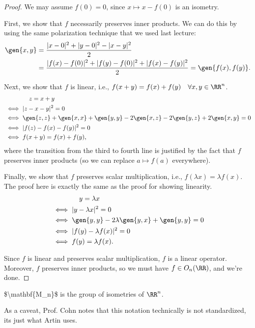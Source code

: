 \begin{proof}
We may assume $f(0)=0$, since $x\mapsto x-f(0)$ is an isometry.

First, we show that $f$ necessarily preserves inner products. We can do this by using the same polarization technique that we used last lecture: 
\begin{align*}
    \gen{x,y} &= \frac{\vert x-0\vert ^2 + \vert y-0\vert ^2 - \vert x-y\vert^2}{2} \\
    &= \frac{\vert f(x)-f(0)\vert ^2 + \vert f(y)-f(0)\vert ^2 + \vert f(x) - f(y)\vert ^2}{2} = \gen{f(x), f(y)}.
\end{align*}

Next, we show that $f$ is linear, i.e., $f(x+y) = f(x)+f(y)\quad \forall x,y\in \RR^n$. 
\begin{align*}
    &\qquad\qquad  z = x+y\\
    &\iff \vert z-x-y\vert^2 = 0 \\
    &\iff \gen{z,z} + \gen{x,x} + \gen{y,y} - 2\gen{x,z} - 2\gen{y,z} + 2\gen{x,y} = 0 \\
    &\iff \vert f(z) - f(x) - f(y)\vert ^2 = 0\\
    &\iff f(x+y) = f(x) + f(y),
\end{align*}
where the transition from the third to fourth line is justified by the fact that $f$ preserves inner products (so we can replace $a\mapsto f(a)$ everywhere). 

Finally, we show that $f$ preserves scalar multiplication, i.e., $f(\lambda x) = \lambda f(x)$. The proof here is exactly the same as the proof for showing linearity. 
\begin{align*}
    &\qquad\qquad  y = \lambda x\\
    &\iff \vert y-\lambda x\vert^2 = 0 \\
    &\iff \gen{y,y} - 2\lambda\gen{y, x} + \gen{y,y} = 0 \\
    &\iff \vert f(y) - \lambda f(x)\vert ^2 = 0\\
    &\iff f(y) = \lambda f(x).
\end{align*}

Since $f$ is linear and preserves scalar multiplication, $f$ is a linear operator. Moreover, $f$ preserves inner products, so we must have $f\in O_n(\RR)$, and we're done. 
\end{proof}

\begin{definition}

\ac{$\mathbf{M_n}$} is the group of isometries of $\RR^n$.
\end{definition}

As a caveat, Prof. Cohn notes that this notation technically is not standardized, its just what Artin uses. 